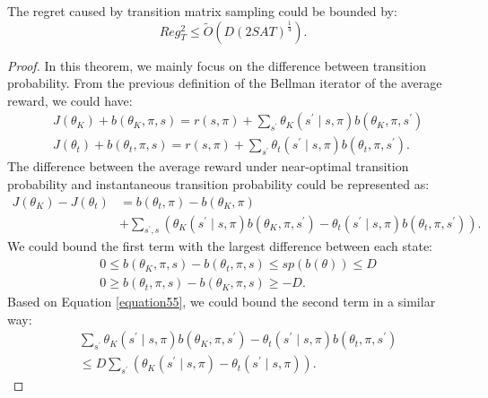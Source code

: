 \begin{theorem}
The regret caused by transition matrix sampling could be bounded by:
$$
Reg_{T}^{2} \leq \tilde{O}(D(2SAT)^{\frac{1}{4}}).
$$
\begin{proof}
In this theorem, we mainly focus on the difference between transition probability. From the previous definition of the Bellman iterator of the average reward, we could have:
\begin{equation}
\begin{aligned}
&J(\theta_{K})+b(\theta_{K}, \pi, s)=r(s, \pi)+\sum_{s^{\prime}} \theta_{K}\left(s^{\prime} \mid s, \pi\right) b\left(\theta_{K}, \pi, s^{\prime}\right) \\
&J\left(\theta_{t}\right)+b\left(\theta_{t}, \pi, s\right)=r(s, \pi)+\sum_{s^{\prime}} \theta_{t}\left(s^{\prime} \mid s, \pi\right) b\left(\theta_{t}, \pi, s^{\prime}\right).
\end{aligned}
\end{equation}
The difference between the average reward under near-optimal transition probability and instantaneous transition probability could be represented as:
\begin{equation}
\begin{aligned}
J(\theta_{K})-J\left(\theta_{t}\right) &=b\left(\theta_{t}, \pi\right)-b(\theta_{K}, \pi) \\
&+\sum_{s^{\prime},s} \left(\theta_{K}\left(s^{\prime} \mid s, \pi\right) b\left(\theta_{K}, \pi, s^{\prime}\right)-\theta_{t}\left(s^{\prime} \mid s, \pi\right) b\left(\theta_{t}, \pi, s^{\prime}\right)\right).
\end{aligned}
\end{equation}
We could bound the first term with the largest difference between each state:
\begin{equation}
\label{equation55}
\begin{aligned}
&0 \leq b(\theta_{K}, \pi, s)-b\left(\theta_{t}, \pi, s\right) \leq s p(b(\theta)) \leq D \\
&0 \geq b\left(\theta_{t}, \pi, s\right)-b(\theta_{K}, \pi, s) \geq-D.
\end{aligned}
\end{equation}
Based on Equation \ref{equation55}, we could bound the second term in a similar way:
\begin{equation}
\label{equation56}
\begin{aligned}
&\sum_{s^{\prime}} \theta_{K}\left(s^{\prime} \mid s, \pi\right) b\left(\theta_{K}, \pi, s^{\prime}\right)-\theta_{t}\left(s^{\prime} \mid s, \pi\right) b\left(\theta_{t}, \pi, s^{\prime}\right) \\
&\leq D \sum_{s^{\prime}}\left(\theta_{K}\left(s^{\prime} \mid s, \pi\right)-\theta_{t}\left(s^{\prime} \mid s, \pi\right)\right).
\end{aligned}
\end{equation}


\end{proof}
\end{theorem}
